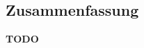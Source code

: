 \begin{otherlanguage}{german}
\chapter*{\thispagestyle{empty}Zusammenfassung}
\label{cha:zusammenfassung}

\textbf{TODO}

\end{otherlanguage}
